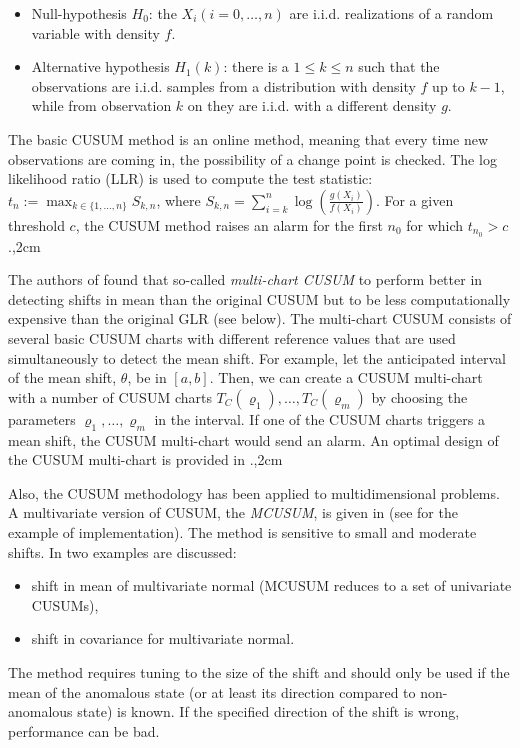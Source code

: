 \documentclass[conference,letterpaper]{IEEEtran}
\begin{document}
\begin{itemize}
\item Null-hypothesis $H_0$: the $X_i (i = 0,\ldots, n)$ are i.i.d. realizations of
a random variable with density $f$.
\item Alternative hypothesis $H_1(k)$: there is a $1\leq k \leq n$ such that the observations are i.i.d. samples from a distribution with density
$f$ up to $k-1$, while from observation $k$ on they are i.i.d. with a different density $g$.
\end{itemize}

The basic CUSUM method is an online method, meaning that every time new observations are coming in, the possibility of a change point is checked. The log likelihood ratio (LLR) is used to compute the test statistic:
$t_n := \max_{k\in\{1,\ldots,n\}} S_{k,n}$, where $S_{k,n} = \sum_{i=k}^n \log(\frac{g(X_i)}{f(X_i)})$. 
For a given threshold $c$, the CUSUM method raises an alarm for the first $n_0$ for which $t_{n_0}>c$.,2cm

The authors of \cite{HTHW} found that so-called \emph{multi-chart CUSUM} to perform better in detecting shifts in mean than the original CUSUM but to be less 
computationally expensive than the original GLR (see below). The multi-chart CUSUM consists of several basic CUSUM charts with different reference values 
that are used simultaneously to detect the mean shift. For example, let the anticipated interval of the mean shift, $\theta$, be in $[a,b]$. Then, we can 
create a CUSUM multi-chart with a number of CUSUM charts $T_C(\varrho_1),\ldots,T_C(\varrho_m)$ by choosing the parameters $\varrho_1,\ldots,\varrho_m$ in 
the interval. If one of the CUSUM charts triggers a mean shift, the CUSUM multi-chart would send an alarm.
An optimal design of the CUSUM multi-chart is provided in \cite{HTHW}.,2cm

Also, the CUSUM methodology has been applied to multidimensional problems. A multivariate version of CUSUM, the \emph{MCUSUM}, is given in \cite{HEALY} (see \cite{RPROJ} for the example of implementation). The method is sensitive to small and moderate shifts. In \cite{HEALY} two examples are discussed: 
\begin{itemize}
\item	shift in mean of multivariate normal (MCUSUM reduces to a set of univariate CUSUMs),
\item	shift in covariance for multivariate normal.
\end{itemize}
The method requires tuning to the size of the shift and should only be used if the mean of the anomalous state (or at least its direction compared to 
non-anomalous state) is known. If the specified direction of the shift is wrong, performance can be bad.
\end{document}
